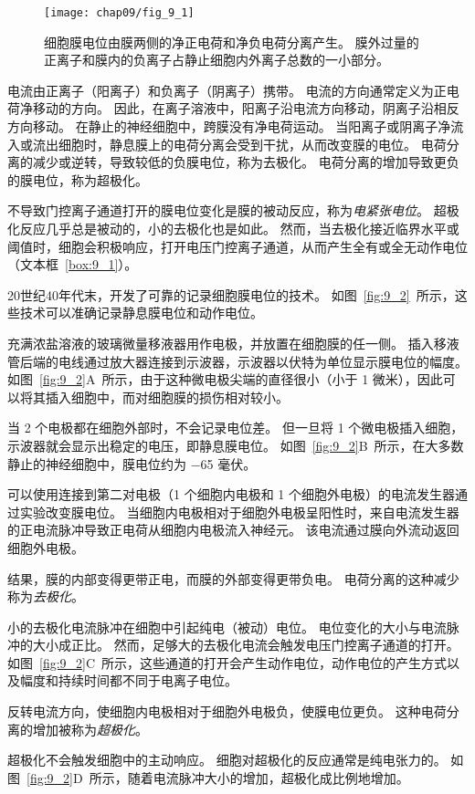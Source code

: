 \begin{figure}[htbp]
	\centering
	\texttt{[image: chap09/fig\_9\_1]}
	\caption{细胞膜电位由膜两侧的净正电荷和净负电荷分离产生。
		膜外过量的正离子和膜内的负离子占静止细胞内外离子总数的一小部分。}
	\label{fig:9_1}
\end{figure}


电流由正离子（阳离子）和负离子（阴离子）携带。
电流的方向通常定义为正电荷净移动的方向。
因此，在离子溶液中，阳离子沿电流方向移动，阴离子沿相反方向移动。
在静止的神经细胞中，跨膜没有净电荷运动。
当阳离子或阴离子净流入或流出细胞时，静息膜上的电荷分离会受到干扰，从而改变膜的电位。
电荷分离的减少或逆转，导致较低的负膜电位，称为去极化。
电荷分离的增加导致更负的膜电位，称为超极化。


不导致门控离子通道打开的膜电位变化是膜的被动反应，称为\textit{电紧张电位}。
超极化反应几乎总是被动的，小的去极化也是如此。
然而，当去极化接近临界水平或阈值时，细胞会积极响应，打开电压门控离子通道，从而产生全有或全无动作电位（文本框~\ref{box:9_1}）。


\begin{proposition}[记录膜电位] \label{box:9_1}
	
	\quad \quad 20世纪40年代末，开发了可靠的记录细胞膜电位的技术。
	如图~\ref{fig:9_2}~所示，这些技术可以准确记录静息膜电位和动作电位。
	
	\quad \quad 充满浓盐溶液的玻璃微量移液器用作电极，并放置在细胞膜的任一侧。
	插入移液管后端的电线通过放大器连接到示波器，示波器以伏特为单位显示膜电位的幅度。
	如图~\ref{fig:9_2}A~所示，由于这种微电极尖端的直径很小（小于 1 微米），因此可以将其插入细胞中，而对细胞膜的损伤相对较小。
	
	\quad \quad 当 2 个电极都在细胞外部时，不会记录电位差。
	但一旦将 1 个微电极插入细胞，示波器就会显示出稳定的电压，即静息膜电位。
	如图~\ref{fig:9_2}B~所示，在大多数静止的神经细胞中，膜电位约为 −65 毫伏。
	
	\quad \quad 可以使用连接到第二对电极（1 个细胞内电极和 1 个细胞外电极）的电流发生器通过实验改变膜电位。
	当细胞内电极相对于细胞外电极呈阳性时，来自电流发生器的正电流脉冲导致正电荷从细胞内电极流入神经元。
	该电流通过膜向外流动返回细胞外电极。
	
	\quad \quad 结果，膜的内部变得更带正电，而膜的外部变得更带负电。
	电荷分离的这种减少称为\textit{去极化}。
	
	\quad \quad 小的去极化电流脉冲在细胞中引起纯电（被动）电位。
	电位变化的大小与电流脉冲的大小成正比。
	然而，足够大的去极化电流会触发电压门控离子通道的打开。
	如图~\ref{fig:9_2}C~所示，这些通道的打开会产生动作电位，动作电位的产生方式以及幅度和持续时间都不同于电离子电位。
	
	\quad \quad 反转电流方向，使细胞内电极相对于细胞外电极负，使膜电位更负。
	这种电荷分离的增加被称为\textit{超极化}。
	
	\quad \quad 超极化不会触发细胞中的主动响应。
	细胞对超极化的反应通常是纯电张力的。
	如图~\ref{fig:9_2}D~所示，随着电流脉冲大小的增加，超极化成比例地增加。

	
\end{proposition}


